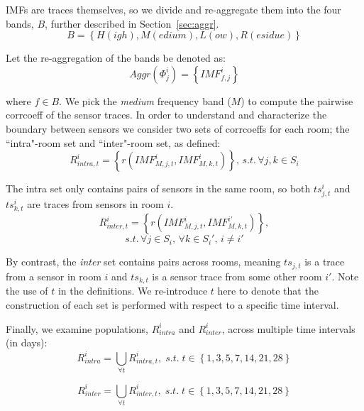 IMFs are traces themselves, so we divide and re-aggregate them into the four bands, $B$,
further described in Section~\ref{sec:aggr}.
\begin{displaymath}
B = \left \{ H(igh), M(edium), L(ow), R(esidue) \right \}
\end{displaymath} 

Let the re-aggregation of the bands be denoted as:
\begin{displaymath}
Aggr(\Phi^i_j) = \left \{ IMF^i_{f,j} \right \}
\end{displaymath} 

where $f \in B$.  We pick the \emph{medium} frequency band ($M$) to compute the pairwise corrcoeff of the sensor traces. 
In order to understand and characterize the boundary between sensors we consider two sets of corrcoeffs for each room; the ``intra"-room set and 
``inter"-room set, as defined:
\begin{displaymath}
R^{i}_{intra,t} = \left \{ r(IMF^{i}_{M,j,t}, IMF^{i}_{M,k,t}) \right \}, \,
s.t.\, \forall j,k \in S_i
\end{displaymath}

The intra set only contains pairs of sensors in the same room, so both $ts^{i}_{j,t}$ and $ts^{i}_{k,t}$ are traces from 
sensors in room $i$.
\begin{displaymath}
R^{i}_{inter,t} = \left \{ r(IMF^{i}_{M,j,t}, IMF^{i'}_{M,k,t}) \right \},
\end{displaymath}
\begin{displaymath}
s.t. \, \forall j \in S_i, \, \forall k \in S_i', \, i \neq i' 
\end{displaymath}

By contrast, the \emph{inter} set contains pairs across rooms, meaning $ts_{j,t}$ is a trace from a sensor in room $i$ and 
$ts_{k,t}$ is a sensor trace from some other room $i'$.  %
Note the use of $t$ in the definitions.  We re-introduce $t$ here to denote that the construction of each set is performed with respect to a specific time interval.

Finally, we examine populations, $R^i_{intra}$ and $R^i_{inter}$, across multiple time intervals (in days):%
\begin{displaymath}
R^{i}_{intra} = \bigcup_{\forall t}^{} R^i_{intra, t}, \; s.t. \; t \in \left \{ 1,3,5,7,14,21,28\right \}
\end{displaymath}

\begin{displaymath}
R^{i}_{inter} = \bigcup_{\forall t}^{} R^i_{inter, t}, \; s.t. \; t \in \left \{  1,3,5,7,14,21,28\right \}
\end{displaymath}

